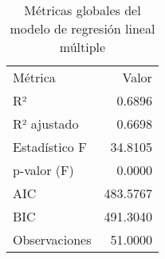 \begin{table}[H]
    \centering
    \color{blue}
    \caption{Métricas globales del modelo de regresión lineal múltiple}
    \label{tab:metricas_regresion}
    \begin{tabular}{lr}
        
            Métrica & Valor \\
        
            R² & 0.6896 \\
            R² ajustado & 0.6698 \\
            Estadístico F & 34.8105 \\
            p-valor (F) & 0.0000 \\
            AIC & 483.5767 \\
            BIC & 491.3040 \\
            Observaciones & 51.0000 \\
        
    \end{tabular}
\end{table}
